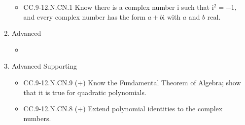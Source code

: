 \documentclass{article}
\begin{document}
\begin{enumerate}
\begin{itemize}
		\item CC.9-12.N.CN.1 Know there is a complex number i such that $\textrm{i}^2 =-1$, and every complex number has the form $a + b\textrm{i}$ with $a$ and $b$ real. 
	\end{itemize}
	\item Advanced
	\begin{itemize}
		\item
	\end{itemize}
	\item Advanced Supporting
	\begin{itemize}
		\item CC.9-12.N.CN.9 (+)  Know the Fundamental Theorem of Algebra; show that it is true for quadratic polynomials.
		\item CC.9-12.N.CN.8 (+)  Extend polynomial identities to the complex numbers.

	\end{itemize}
\end{enumerate}
\newpage
\end{document}
